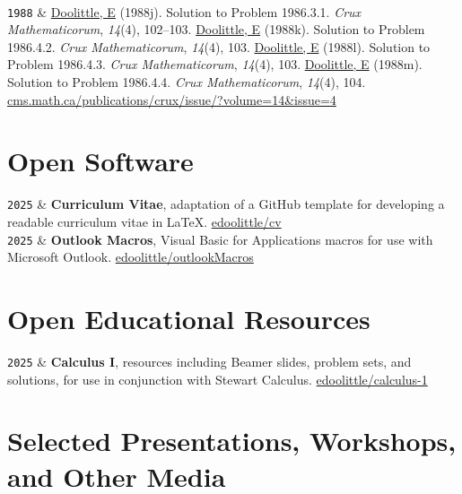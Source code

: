 \documentclass[9pt,a4paper]{article}
\newcommand{\LastName}{Doolittle}
\newcommand{\Initials}{E}
\newcommand{\Me}{\underline{\LastName, \Initials}}  %
\newcommand{\Year}[1]{\fontsize{10pt}{0}\selectfont \texttt{#1}}
\newcommand{\Website}[1]{\href{https://#1}{#1}}
\newcommand{\GitHub}[1]{\faGithub{} \href{https://github.com/#1}{#1}}
\begin{document}
\begin{EntriesTableYear}
  \\
  \Year{1988} & \Me{} (1988j).  Solution to Problem 1986.3.1.  \textit{Crux
  Mathematicorum}, \textit{14}(4), 102--103.  %
  \newline %
  \Me{} (1988k).  Solution to Problem 1986.4.2.  \textit{Crux Mathematicorum},
  \textit{14}(4), 103.  %
  \newline %
  \Me{} (1988l).  Solution to Problem 1986.4.3.  \textit{Crux Mathematicorum},
  \textit{14}(4), 103.  %
  \newline %
  \Me{} (1988m).  Solution to Problem 1986.4.4.  \textit{Crux Mathematicorum},
  \textit{14}(4), 104.  %
  \newline %
  \Website{cms.math.ca/publications/crux/issue/?volume=14\&issue=4}
\end{EntriesTableYear}
      
\section{Open Software}

\begin{EntriesTableYear}
  \Year{2025} & \textbf{Curriculum Vitae}, adaptation of a GitHub
  template for developing a readable curriculum vitae in \LaTeX.
  \GitHub{edoolittle/cv} %
  \\ %
  \Year{2025} & \textbf{Outlook Macros}, Visual Basic for Applications
  macros for use with Microsoft Outlook.
  \GitHub{edoolittle/outlookMacros}
\end{EntriesTableYear}

\section{Open Educational Resources}

\begin{EntriesTableYear}
  \Year{2025} & \textbf{Calculus I}, resources including Beamer
  slides, problem sets, and solutions, for use in conjunction with
  Stewart Calculus.  \GitHub{edoolittle/calculus-1}
\end{EntriesTableYear}

\section{Selected Presentations, Workshops, and Other Media}
\end{document}

